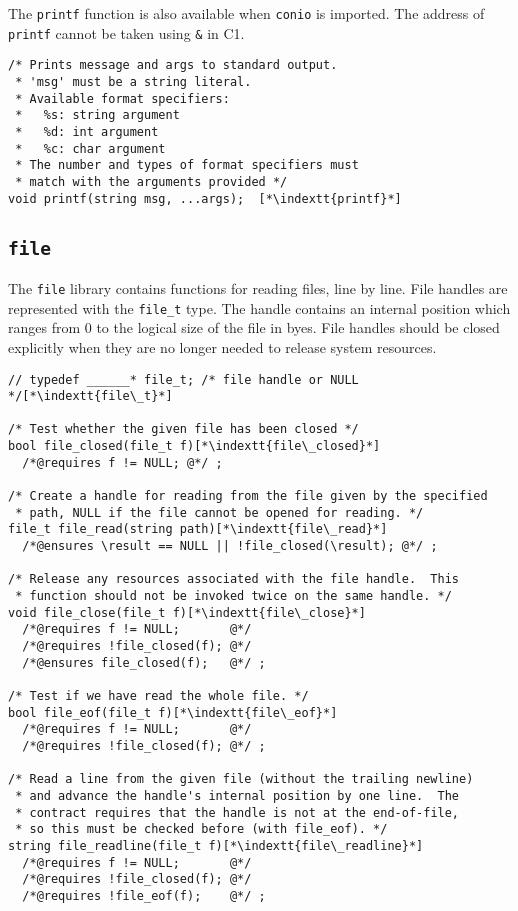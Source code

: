 \documentclass[11pt]{article}
\makeatletter
\newcommand{\indextt}[1]{\index{#1@\texttt{#1}}}
\makeatother
\begin{document}
The \lstinline'printf' function is also available when \lstinline'conio' is imported.
The address of \lstinline'printf' cannot be taken using \lstinline'&' in C1.
\begin{lstlisting}
/* Prints message and args to standard output.
 * 'msg' must be a string literal.
 * Available format specifiers:
 *   %s: string argument
 *   %d: int argument
 *   %c: char argument
 * The number and types of format specifiers must
 * match with the arguments provided */
void printf(string msg, ...args);  [*\indextt{printf}*]
\end{lstlisting}

\newpage
\subsection{\tt file}

The \lstinline'file' library contains functions for reading files, line by
line.  File handles are represented with the \lstinline'file_t' type.  The
handle contains an internal position which ranges from 0 to the
logical size of the file in byes.  File handles should be closed
explicitly when they are no longer needed to release system resources.

\begin{lstlisting}
// typedef ______* file_t; /* file handle or NULL */[*\indextt{file\_t}*]

/* Test whether the given file has been closed */
bool file_closed(file_t f)[*\indextt{file\_closed}*]
  /*@requires f != NULL; @*/ ;

/* Create a handle for reading from the file given by the specified
 * path, NULL if the file cannot be opened for reading. */
file_t file_read(string path)[*\indextt{file\_read}*]
  /*@ensures \result == NULL || !file_closed(\result); @*/ ;

/* Release any resources associated with the file handle.  This
 * function should not be invoked twice on the same handle. */
void file_close(file_t f)[*\indextt{file\_close}*]
  /*@requires f != NULL;       @*/
  /*@requires !file_closed(f); @*/
  /*@ensures file_closed(f);   @*/ ;

/* Test if we have read the whole file. */
bool file_eof(file_t f)[*\indextt{file\_eof}*]
  /*@requires f != NULL;       @*/
  /*@requires !file_closed(f); @*/ ;

/* Read a line from the given file (without the trailing newline)
 * and advance the handle's internal position by one line.  The
 * contract requires that the handle is not at the end-of-file,
 * so this must be checked before (with file_eof). */
string file_readline(file_t f)[*\indextt{file\_readline}*]
  /*@requires f != NULL;       @*/
  /*@requires !file_closed(f); @*/
  /*@requires !file_eof(f);    @*/ ;
\end{lstlisting}
\end{document}
